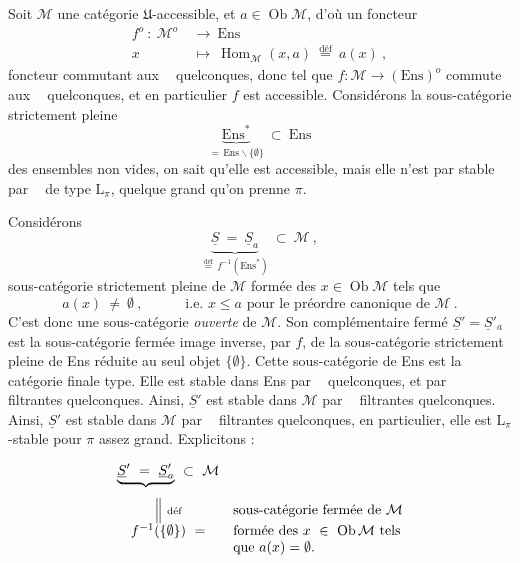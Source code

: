 \documentclass[11pt]{article}
\newcommand{\msp}[1]{\marginpar{\footnotesize [#1]}}
\newcommand{\limind}{\mathop{\underrightarrow{\mathrm{lim}}}}
\newcommand{\limproj}{\mathop{\underleftarrow{\mathrm{lim}}}}
\begin{document}
Soit $\mathcal{M}$ une catégorie $\mathfrak{U}$-accessible, et $a\in\operatorname{Ob}\mathcal{M}$, d'où un foncteur
\[
\begin{aligned}
f^o\ :\ \mathcal{M}^o\ &\longrightarrow\ \mathrm{Ens}\\
x\ &\longmapsto\ \operatorname{Hom}_{\mathcal{M}}(x,a)\ \overset{\text{déf}}{=}\ a(x)\ ,
\end{aligned}
\]
foncteur commutant aux $\limproj$ quelconques, donc tel que $f:\mathcal{M}\longrightarrow(\mathrm{Ens})^o$ commute aux $\limind$ quelconques, et en particulier $f$ est accessible. Considérons la sous-catégorie strictement pleine
\msp{page 12}
\[
\underbrace{\mathrm{Ens}^*}_{=\,\mathrm{Ens}\backslash\{\emptyset\}}\ \subset\ \mathrm{Ens}
\]
des ensembles non vides, on sait qu'elle est accessible, mais elle n'est par stable par $\limproj$ de type $\mathrm{L}_\pi$, quelque grand qu'on prenne $\pi$. %

Considérons
\[
\underbrace{\underline{S}\ =\ \underline{S}_a}_{\overset{\text{déf}}{=}\,f^{-1}(\mathrm{Ens}^*)}\ \subset\ \mathcal{M}\ ,
\]
sous-catégorie strictement pleine de $\mathcal{M}$ formée des $x\in\operatorname{Ob}\mathcal{M}$ tels que
\[
a(x)\ \neq\ \emptyset\ ,\qquad\quad \text{i.e. } x\leqslant a \text{ pour le préordre canonique de } \mathcal{M}\ .
\]
C'est donc une sous-catégorie \textit{ouverte} de $\mathcal{M}$. Son complémentaire fermé $\underline{S}'=\underline{S}'_a$ est la sous-catégorie fermée image inverse, par $f$, de la sous-catégorie strictement pleine de Ens réduite au seul objet $\{\emptyset\}$. Cette sous-catégorie de Ens est la catégorie finale type. Elle est stable dans Ens par $\limind$ quelconques, et par $\limproj$ filtrantes quelconques. Ainsi, $\underline{S}'$ est stable dans $\mathcal{M}$ par $\limind$ filtrantes quelconques. Ainsi, $\underline{S}'$ est stable dans $\mathcal{M}$ par $\limind$ filtrantes quelconques, en particulier, elle est $\mathrm{L}_\pi$-stable pour $\pi$ assez grand. Explicitons :

\msp{page 13}
\[
\begin{array}{cl}
\underbrace{\underline{S}'\ =\ \underline{S}'_a}_{}\ \subset\ \mathcal{M} & \\
\Big\|\ \text{\scriptsize déf} & \text{sous-catégorie fermée de } \mathcal{M}\\
f^{-1}(\{\emptyset\})\ = & \text{formée des } x\ \in\ \operatorname{Ob}\mathcal{M} \text{ tels}\\
 & \text{que } a(x)=\emptyset.
\end{array}
\]
\end{document}
